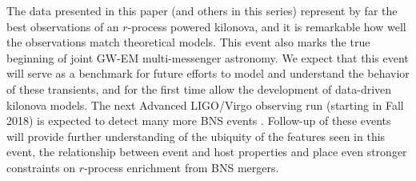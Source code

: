 The data presented in this paper (and others in this series) represent by far the best observations of an $r$-process powered kilonova, and it is remarkable how well the observations match theoretical models.  This event also marks the true beginning of joint GW-EM multi-messenger astronomy.  We expect that this event will serve as a benchmark for future efforts to model and understand the behavior of these transients, and for the first time allow the development of data-driven kilonova models. The next Advanced LIGO/Virgo observing run (starting in Fall 2018) is expected to detect many more BNS events \citep{LIGOLocalization}. Follow-up of these events will provide further understanding of the ubiquity of the features seen in this event, the relationship between event and host properties and place even stronger constraints on $r$-process enrichment from BNS mergers.

